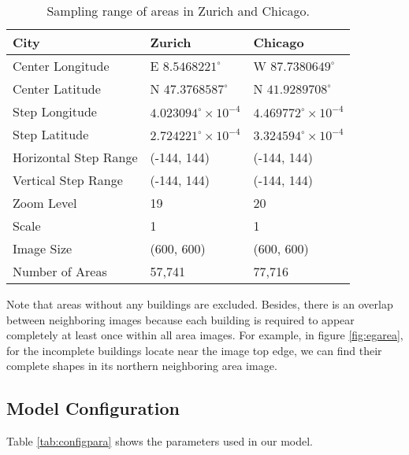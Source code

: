 \begin{table}[!h]
	\centering
	\caption[Sampling range of areas in Zurich and Chicago]{Sampling range of areas in Zurich and Chicago.}
	\label{tab:arerange}
	\begin{tabular}{l|l|l}
	\hline
	City & Zurich & Chicago \\ \hline
	Center Longitude & E $8.5468221^\circ$ & W $87.7380649^\circ$ \\
	Center Latitude & N $47.3768587^\circ$ & N $41.9289708^\circ$ \\
	Step Longitude & $4.023094^\circ\times10^{-4}$ & $4.469772^\circ\times10^{-4}$ \\
	Step Latitude & $2.724221^\circ\times10^{-4}$ & $3.324594^\circ\times10^{-4}$ \\
	Horizontal Step Range & (-144, 144) & (-144, 144) \\
	Vertical Step Range & (-144, 144) & (-144, 144) \\
	Zoom Level & 19 & 20 \\
	Scale & 1 & 1 \\
	Image Size & (600, 600) & (600, 600) \\
	\hline
	Number of Areas & 57,741 & 77,716 \\
	\hline
	\end{tabular}
\end{table}

Note that areas without any buildings are excluded. Besides, there is an overlap between neighboring images because each building is required to appear completely at least once within all area images. For example, in figure \ref{fig:egarea}, for the incomplete buildings locate near the image top edge, we can find their complete shapes in its northern neighboring area image.

\subsection{Model Configuration}\label{config}

Table \ref{tab:configpara} shows the parameters used in our model.

